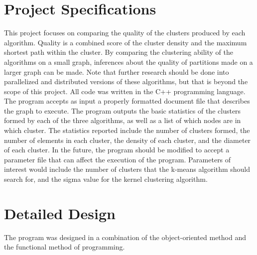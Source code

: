 \documentclass[12pt]{article}
\begin{document}
\newpage
\section{Project Specifications}
This project focuses on comparing the quality of the clusters produced by each algorithm. Quality is a combined score  of the cluster density and the maximum shortest path within the cluster. By comparing the clustering ability of the algorithms on a small graph, inferences about the quality of partitions made on a larger graph can be made. Note that further research should be done into parallelized and distributed versions of these algorithms, but that is beyond the scope of this project.
\newline\newline
All code was written in the C++ programming language. The program accepts as input a properly formatted document file that describes the graph to execute. The program outputs the basic statistics of the clusters formed by each of the three algorithms, as well as a list of which nodes are in which cluster. The statistics reported include the number of clusters formed, the number of elements in each cluster, the density of each cluster, and the diameter of each cluster.
\newline\newline
In the future, the program should be modified to accept a parameter file that can affect the execution of the program. Parameters of interest would include the number of clusters that the k-means algorithm should search for, and the sigma value for the kernel clustering algorithm.

\newpage
\section{Detailed Design}
The program was designed in a combination of the object-oriented method and the functional method of programming.
\end{document}
